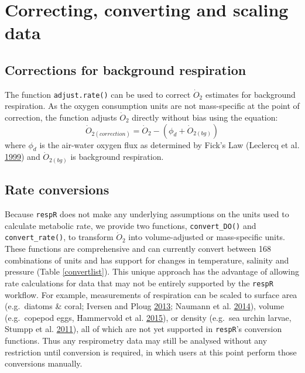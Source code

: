 \documentclass[a4paper,10pt, oneside]{memoir}
\begin{document}
\section{Correcting, converting and scaling data}

\subsection{Corrections for background respiration}

The function \texttt{adjust.rate()} can be used to correct \(\dot{O} \mathrm{_2}\) estimates for background respiration.
As the oxygen consumption units are not mass-specific at the point of correction, the function adjusts \(\dot{O} \mathrm{_2}\) directly without bias using the equation: \[\dot O_{2(correction)} = \dot O_2 - (\phi_d + \dot O_{2(bg)})\] where \(\phi_d\) is the air-water oxygen flux as determined by Fick's Law (Leclercq et al. \protect\hyperlink{ref-Leclercq1999}{1999}) and \(\dot O_{2(bg)}\) is background respiration.

\subsection{Rate conversions}\label{rate-conversions}

Because \texttt{respR} does not make any underlying assumptions on the units used to calculate metabolic rate, we provide two functions, \texttt{convert\_DO()} and \texttt{convert\_rate()}, to transform \(\dot{O} \mathrm{_2}\) into volume-adjusted or mass-specific units.
These functions are comprehensive and can currently convert between 168 combinations of units and has support for changes in temperature, salinity and pressure (Table \ref{convertlist}).
This unique approach has the advantage of allowing rate calculations for data that may not be entirely supported by the \texttt{respR} workflow.
For example, measurements of respiration can be scaled to surface area (e.g.~diatoms \& coral; Iversen and Ploug \protect\hyperlink{ref-Iversen2013}{2013}; Naumann et al. \protect\hyperlink{ref-Naumann2014}{2014}), volume (e.g.~copepod eggs, Hammervold et al. \protect\hyperlink{ref-Hammervold2015}{2015}), or density (e.g.~sea urchin larvae, Stumpp et al. \protect\hyperlink{ref-Stumpp2011}{2011}), all of which are not yet supported in \texttt{respR}'s conversion functions.
Thus any respirometry data may still be analysed without any restriction until conversion is required, in which users at this point perform those conversions manually.
\end{document}
